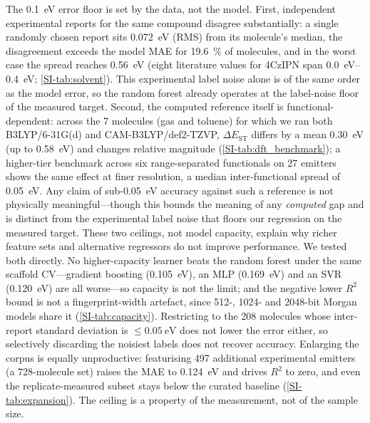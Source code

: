 The \qty{0.1}{\electronvolt} error floor is set by the data, not the model.
First, independent experimental reports for the same compound disagree
substantially: a single randomly chosen report sits \qty{0.072}{\electronvolt} (RMS)
from its molecule's median, the disagreement exceeds the model MAE for
\qty{19.6}{\percent} of molecules, and in the worst case the spread reaches
\qty{0.56}{\electronvolt} (eight literature values for 4CzIPN span
\qtyrange{0.0}{0.4}{\electronvolt}; \cref{SI-tab:solvent}). This experimental label
noise alone is of the same order as the model error, so the random forest already
operates at the label-noise floor of the measured target.
Second, the computed reference itself is functional-dependent: across the
\num{7} molecules (gas and toluene) for which we ran both B3LYP/6-31G(d) and CAM-B3LYP/def2-TZVP,
$\Delta E_\text{ST}$ differs by a mean \qty{0.30}{\electronvolt} (up to
\qty{0.58}{\electronvolt}) and changes
relative magnitude (\cref{SI-tab:dft_benchmark}); a higher-tier benchmark across
six range-separated functionals on \num{27} emitters~\cite{Froitzheim2024} shows the same
effect at finer resolution, a median inter-functional spread of \qty{0.05}{\electronvolt}. Any claim of sub-\num{0.05}~eV
accuracy against such a reference is not physically meaningful---though this bounds the
meaning of any \emph{computed} gap and is distinct from the experimental label noise that
floors our regression on the measured target. These two ceilings,
not model capacity, explain why richer feature sets and alternative regressors do
not improve performance. We tested both directly. No higher-capacity learner beats the
random forest under the same scaffold CV---gradient boosting (\qty{0.105}{\electronvolt}),
an MLP (\qty{0.169}{\electronvolt}) and an SVR (\qty{0.120}{\electronvolt}) are all
worse---so capacity is not the limit; and the negative lower $R^2$ bound is not a
fingerprint-width artefact, since \num{512}-, \num{1024}- and \num{2048}-bit Morgan models
share it (\cref{SI-tab:capacity}). Restricting to the \num{208} molecules whose
inter-report standard deviation is $\le\qty{0.05}{\electronvolt}$ does not lower the error
either, so selectively discarding the noisiest labels does not recover accuracy.
Enlarging the corpus is equally unproductive: featurising \num{497} additional experimental
emitters (a \num{728}-molecule set) raises the MAE to \qty{0.124}{\electronvolt} and drives
$R^2$ to zero, and even the replicate-measured subset stays below the curated baseline
(\cref{SI-tab:expansion}). The ceiling is a property of the measurement, not of the sample size.

